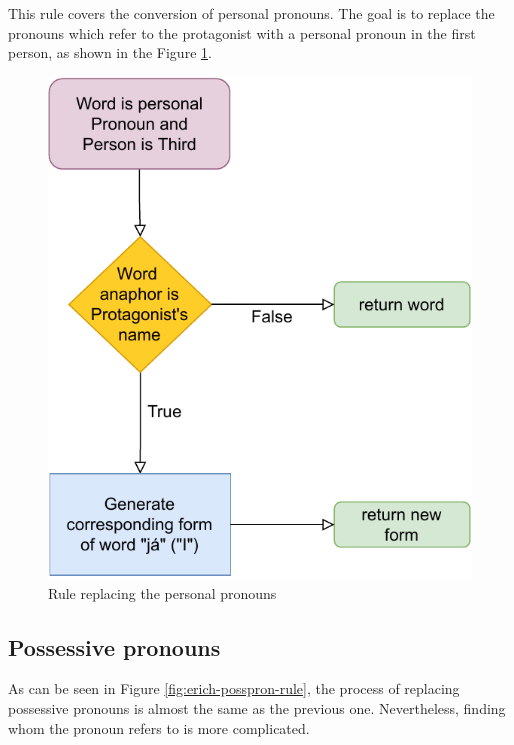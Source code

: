 This rule covers the conversion of personal pronouns. The goal is to replace the pronouns which refer to the protagonist with a personal pronoun in the first person, as shown in the Figure \ref{fig:erich-perspron-rule}.

\begin{figure}[!htbp]
\includegraphics[]{data/Erich-Perspron-Rule.pdf}
\caption{Rule replacing the personal pronouns}
\label{fig:erich-perspron-rule}
\end{figure}

\subsection{Possessive pronouns}

As can be seen in Figure \ref{fig:erich-posspron-rule}, the process of replacing possessive pronouns is almost the same as the previous one. Nevertheless, finding whom the pronoun refers to is more complicated.

